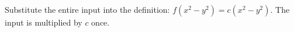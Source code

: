 Substitute the entire input into the definition: $\boxed{f(x^2-y^2)=c(x^2-y^2)}$. The input is multiplied by $c$ once.
